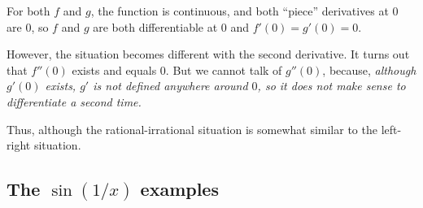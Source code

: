 \documentclass[10pt]{amsart}
\begin{document}
\begin{enumerate}
  For both $f$ and $g$, the function is continuous, and both ``piece''
  derivatives at $0$ are $0$, so $f$ and $g$ are both differentiable
  at $0$ and $f'(0) = g'(0) = 0$.

  However, the situation becomes different with the second
  derivative. It turns out that $f''(0)$ exists and equals $0$. But we
  cannot talk of $g''(0)$, because, {\em although $g'(0)$ exists, $g'$
  is not defined anywhere around $0$, so it does not make sense to
  differentiate a second time.}

  Thus, although the rational-irrational situation is somewhat similar
  to the left-right situation.
\end{enumerate}

\subsection{The $\sin(1/x)$ examples}
\end{document}
